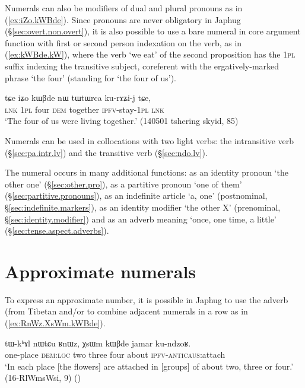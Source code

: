 Numerals can also be modifiers of dual and plural pronouns as in (\ref{ex:iZo.kWBde}). Since pronouns are never obligatory in Japhug (§\ref{sec:overt.non.overt}), it is also possible to use a bare numeral in core argument function with first or second person indexation on the verb, as in (\ref{ex:kWBde.kW}), where the verb  `we eat' of the second proposition has the \textsc{1pl}  suffix indexing the transitive subject, coreferent with the ergatively-marked phrase  `the four' (standing for  `the four of us').

\begin{exe}
\ex \label{ex:iZo.kWBde} 
\gll tɕe iʑo kɯβde nɯ tɯtɯrca ku-rɤʑi-j tɕe, \\
\textsc{lnk} \textsc{1pl} four \textsc{dem}  together \textsc{ipfv}-stay-\textsc{1pl} \textsc{lnk} \\
\glt `The four of us were living together.' (140501  tshering skyid, 85)
\end{exe}		

Numerals can be used in collocations with two light verbs: the intransitive verb   (§\ref{sec:pa.intr.lv}) and the transitive verb  (§\ref{sec:ndo.lv}).
 
The numeral  occurs in many additional functions: as an identity pronoun `the other one' (§\ref{sec:other.pro}), as a partitive pronoun `one of them' (§\ref{sec:partitive.pronouns}), as an indefinite article `a, one' (postnominal, §\ref{sec:indefinite.markers}), as an identity modifier `the other X' (prenominal, §\ref{sec:identity.modifier}) and  as an adverb meaning `once, one time, a little' (§\ref{sec:tense.aspect.adverbs}).
 
\section{Approximate numerals} \label{sec:approx.numerals}
To express an approximate number, it is possible in Japhug to use the adverb  (from Tibetan  and/or to combine adjacent numerals in a row as in (\ref{ex:RnWz.XsWm.kWBde}).

\begin{exe}
\ex \label{ex:RnWz.XsWm.kWBde}
\gll tɯ-kʰɤl nɯtɕu ʁnɯz, χsɯm kɯβde jamar ku-ndzoʁ. \\
one-place \textsc{dem}:\textsc{loc} two three four about \textsc{ipfv}-\textsc{anticaus}:attach \\
\glt `In each place [the flowers] are attached in [groups] of about two, three or four.' (16-RlWmsWsi, 9)
()
\end{exe}

